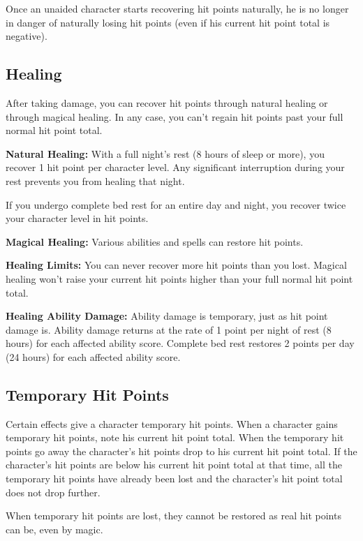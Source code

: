 Once an unaided character starts recovering hit points naturally, he is no longer in danger of naturally losing hit points (even if his current hit point total is negative).

\subsection{Healing}

After taking damage, you can recover hit points through natural healing or through magical healing. In any case, you can't regain hit points past your full normal hit point total.

\textbf{Natural Healing:} With a full night's rest (8 hours of sleep or more), you recover 1 hit point per character level. Any significant interruption during your rest prevents you from healing that night.

If you undergo complete bed rest for an entire day and night, you recover twice your character level in hit points. 

\textbf{Magical Healing:} Various abilities and spells can restore hit points.

\textbf{Healing Limits:} You can never recover more hit points than you lost. Magical healing won't raise your current hit points higher than your full normal hit point total.

\textbf{Healing Ability Damage:} Ability damage is temporary, just as hit point damage is. Ability damage returns at the rate of 1 point per night of rest (8 hours) for each affected ability score. Complete bed rest restores 2 points per day (24 hours) for each affected ability score.

\subsection{Temporary Hit Points}

Certain effects give a character temporary hit points. When a character gains temporary hit points, note his current hit point total. When the temporary hit points go away the character's hit points drop to his current hit point total. If the character's hit points are below his current hit point total at that time, all the temporary hit points have already been lost and the character's hit point total does not drop further.

When temporary hit points are lost, they cannot be restored as real hit points can be, even by magic.

